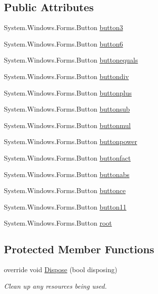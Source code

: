 \subsection*{Public Attributes}
\begin{DoxyCompactItemize}
\item 
System.\+Windows.\+Forms.\+Button \hyperlink{classpokus_1_1Form1_a4f9f5e2ad5a81fd690dae321c822e9d6}{button3}
\item 
System.\+Windows.\+Forms.\+Button \hyperlink{classpokus_1_1Form1_a0176e28b0300cffaf5233221160d8819}{button6}
\item 
System.\+Windows.\+Forms.\+Button \hyperlink{classpokus_1_1Form1_a8c13359112a696acc4115dabbbf6384a}{buttonequals}
\item 
System.\+Windows.\+Forms.\+Button \hyperlink{classpokus_1_1Form1_a8a4e01d4f371e552e2992b3fce4f0caf}{buttondiv}
\item 
System.\+Windows.\+Forms.\+Button \hyperlink{classpokus_1_1Form1_a967f22539b61592f15df2ae6a087b6e5}{buttonplus}
\item 
System.\+Windows.\+Forms.\+Button \hyperlink{classpokus_1_1Form1_a192b6a454ea0c3b9c2472b55301ad3e9}{buttonsub}
\item 
System.\+Windows.\+Forms.\+Button \hyperlink{classpokus_1_1Form1_a9c09c5cca3e7ea82d087747de71a3466}{buttonmul}
\item 
System.\+Windows.\+Forms.\+Button \hyperlink{classpokus_1_1Form1_a627ac5a2200ea94b232a465ccf7ad883}{buttonpower}
\item 
System.\+Windows.\+Forms.\+Button \hyperlink{classpokus_1_1Form1_a1b0a460ccc81b4eb38a892d0587434a9}{buttonfact}
\item 
System.\+Windows.\+Forms.\+Button \hyperlink{classpokus_1_1Form1_a4f6946b9f61cef4dfc810e4336b51348}{buttonabs}
\item 
System.\+Windows.\+Forms.\+Button \hyperlink{classpokus_1_1Form1_a11a1d9f87f27db44987024bfe4c41912}{buttonce}
\item 
System.\+Windows.\+Forms.\+Button \hyperlink{classpokus_1_1Form1_adb3eefca0a1ebdaad882b13e3f1f5ff3}{button11}
\item 
System.\+Windows.\+Forms.\+Button \hyperlink{classpokus_1_1Form1_a7717a2a50c484f641bdcc54cd679a193}{root}
\end{DoxyCompactItemize}
\subsection*{Protected Member Functions}
\begin{DoxyCompactItemize}
\item 
override void \hyperlink{classpokus_1_1Form1_a24b23515810a6e52f80e600649e7f5a3}{Dispose} (bool disposing)
\begin{DoxyCompactList}\small\item\em Clean up any resources being used. \end{DoxyCompactList}\end{DoxyCompactItemize}


